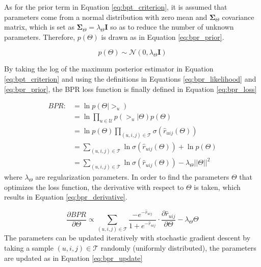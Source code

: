    As for the prior term in Equation \ref{eq:bpt_criterion}, it is assumed that parameters come from a normal distribution with zero mean and $\mathbf{\Sigma}_\Theta$ covariance matrix, which is set as $\mathbf{\Sigma}_\Theta = \lambda_\Theta \mathbf{I}$ so as to reduce the number of unknown parameters. Therefore, $p(\Theta)$ is drawn as in Equation \ref{eq:bpr_prior}.
   
   \begin{equation}
       p(\Theta) \sim \mathcal{N}(0, \lambda_\Theta \mathbf{I})
       \label{eq:bpr_prior}
   \end{equation}
   
   By taking the log of the maximum posterior estimator in Equation \ref{eq:bpt_criterion} and using the definitions in Equations \ref{eq:bpr_likelihood} and \ref{eq:bpr_prior}, the BPR loss function is finally defined in Equation \ref{eq:bpr_loss}
   
   \begin{equation}
       \begin{split}
           BPR :&= \ln p(\Theta | >_u) \\
                &= \ln \prod_{u \in \mathcal{U}} p( >_u | \Theta) p(\Theta) \\
                &= \ln p(\Theta) \prod_{(u, i, j) \in \mathcal{T}} \sigma(\hat{r}_{uij}(\Theta)) \\
                &= \sum_{(u, i, j) \in \mathcal{T}} \ln \sigma(\hat{r}_{uij}(\Theta)) + \ln p(\Theta) \\ 
                &= \sum_{(u, i, j) \in \mathcal{T}} \ln \sigma(\hat{r}_{uij}(\Theta)) - \lambda_\Theta ||\Theta||^2
       \end{split}
       \label{eq:bpr_loss}
   \end{equation} where $\lambda_\Theta$ are regularization parameters. In order to find the parameters $\Theta$ that optimizes the loss function, the derivative with respect to $\Theta$ is taken, which results in Equation \ref{eq:bpr_derivative}.
   
   \begin{equation}
       \frac{\partial BPR}{\partial \Theta} \propto \sum_{(u,i,j) \in \mathcal{T}} \frac{-e^{-\hat{r}_{uij}}}{1+e^{-\hat{r}_{uij}}} \cdot \frac{\partial \hat{r}_{uij}}{\partial \Theta} - \lambda_\Theta \Theta
       \label{eq:bpr_derivative}
   \end{equation} The parameters can be updated iteratively with stochastic gradient descent by taking a sample $(u,i,j) \in \mathcal{T}$ randomly (uniformly distributed), the parameters are updated as in Equation \ref{eq:bpr_update}
   
